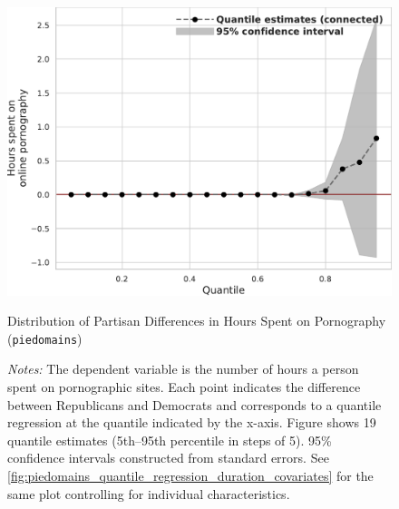 \documentclass[12pt,twoside]{article}
\begin{document}
\begin{figure}[ht]
	\centering
	\includegraphics[width=.6\linewidth]{figs/piedomains_quantile_reg_duration_adult.pdf}
	\caption{Distribution of Partisan Differences in Hours Spent on Pornography (\texttt{piedomains})}
	\caption*{\footnotesize \emph{Notes:} 
		The dependent variable is the number of hours a person spent on pornographic sites. Each point indicates the difference between Republicans and Democrats and corresponds to a quantile regression at the quantile indicated by the x-axis. Figure shows 19 quantile estimates (5th--95th percentile in steps of 5). 95\% confidence intervals constructed from standard errors. See \cref{fig:piedomains_quantile_regression_duration_covariates} for the same plot controlling for individual characteristics.
	}
	\label{fig:piedomains_quantile_regression_duration}
\end{figure}
\end{document}
